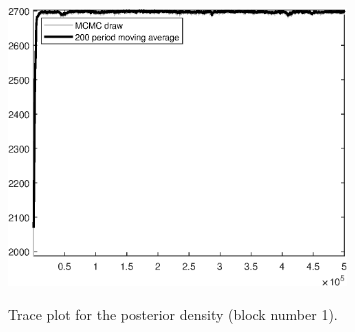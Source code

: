 \begin{figure}[H]
\centering
  \includegraphics[width=0.8\textwidth]{BRS_growth_ext_fd/graphs/TracePlot_Posterior_blck_1}\\
    \caption{Trace plot for the posterior density (block number 1).}
\end{figure}

